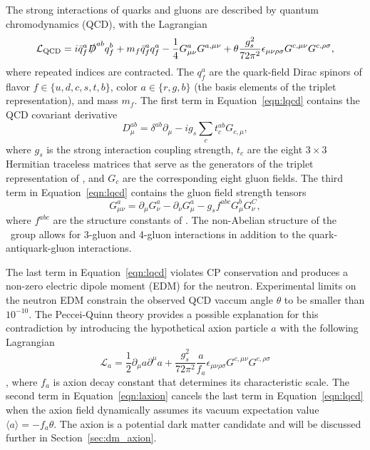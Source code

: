 The strong interactions of quarks and gluons are described by quantum chromodynamics (QCD), with the Lagrangian
\begin{equation}
  \label{eqn:lqcd}
  \mathcal{L}_{\text{QCD}} = i \bar q_f^a \slashed D^{ab} q_f^b + m_f \bar q_f^a q_f^a - \frac{1}{4} G_{\mu\nu}^a G^{a,\mu\nu} + \theta \frac{g_s^2}{72\pi^2} \epsilon_{\mu\nu\rho\sigma} G^{c,\mu\nu} G^{c, \rho\sigma},
\end{equation}
where repeated indices are contracted.
The $q_f^a$ are the quark-field Dirac spinors of flavor $f \in \{u,d,c,s,t,b\}$, color $a \in \{r,g,b\}$ (the basis elements of the triplet representation), and mass $m_f$.
The first term in Equation~\ref{eqn:lqcd} contains the QCD covariant derivative
\begin{equation}
  D_{\mu}^{ab} = \delta^{ab} \partial_\mu - i g_s \sum_{c} t_c^{ab} G_{c,\mu},
\end{equation}
where $g_s$ is the strong interaction coupling strength, $t_c$ are the eight $3\times3$ Hermitian traceless matrices that serve as the generators of the triplet representation of \suthree, and $G_c$ are the corresponding eight gluon fields.
The third term in Equation~\ref{eqn:lqcd} contains the gluon field strength tensors
\begin{equation}
  G_{\mu\nu}^a = \partial_\mu G_\nu^a - \partial_\nu G_\mu^a - g_s f^{abc} G_\mu^b G_\nu^C,
\end{equation}
where $f^{abc}$ are the structure constants of \suthree.
The non-Abelian structure of the \suthree\ group allows for 3-gluon and 4-gluon interactions in addition to the quark-antiquark-gluon interactions.

The last term in Equation~\ref{eqn:lqcd} violates CP conservation and produces a non-zero electric dipole moment (EDM) for the neutron.
Experimental limits on the neutron EDM constrain the observed QCD vaccum angle $\theta$ to be smaller than $10^{-10}$.
The Peccei-Quinn theory provides a possible explanation for this contradiction by introducing the hypothetical axion particle $a$ with the following Lagrangian %
\begin{equation}
  \label{eqn:laxion}
  \mathcal{L}_a = \frac{1}{2} \partial_\mu a \partial^\mu a + \frac{g_s^2}{72 \pi^2} \frac{a}{f_a} \epsilon_{\mu\nu\rho\sigma} G^{c,\mu\nu} G^{c, \rho\sigma}
\end{equation},
where $f_a$ is axion decay constant that determines its characteristic scale.
The second term in Equation~\ref{eqn:laxion} cancels the last term in Equation~\ref{eqn:lqcd} when the axion field dynamically assumes its vacuum expectation value $\langle a \rangle = - f_a \theta$.
The axion is a potential dark matter candidate and will be discussed further in Section~\ref{sec:dm_axion}.


